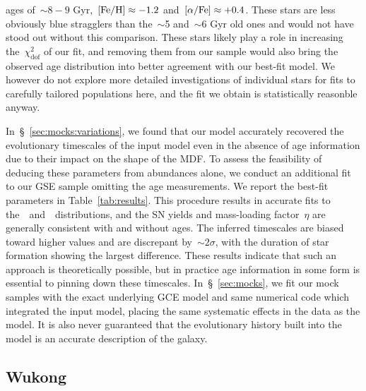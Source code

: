 \documentclass[ms.tex]{subfiles}
\begin{document}
ages of~$\sim$$8 - 9$ Gyr,~$\text{[Fe/H]} \approx -1.2$ and~$\text{[$\alpha$/Fe]} \approx +0.4$.
These stars are less obviously blue stragglers than the~$\sim$5 and~$\sim$6 Gyr
old ones and would not have stood out without this comparison.
These stars likely play a role in increasing the~$\chi_\text{dof}^2$ of our
fit, and removing them from our sample would also bring the observed age
distribution into better agreement with our best-fit model.
We however do not explore more detailed investigations of individual stars for
fits to carefully tailored populations here, and the fit we obtain is
statistically reasonble anyway.
\par
In~\S~\ref{sec:mocks:variations}, we found that our model accurately recovered
the evolutionary timescales of the input model even in the absence of age
information due to their impact on the shape of the MDF.
To assess the feasibility of deducing these parameters from abundances alone,
we conduct an additional fit to our GSE sample omitting the age measurements.
We report the best-fit parameters in Table~\ref{tab:results}.
This procedure results in accurate fits to the~\feh~and~\afe~distributions, and
the SN yields and mass-loading factor~$\eta$ are generally consistent with
and without ages.
The inferred timescales are biased toward higher values and are discrepant
by~$\sim$$2\sigma$, with the duration of star formation showing the largest
difference.
These results indicate that such an approach is theoretically possible, but in
practice age information in some form is essential to pinning down these
timescales.
In~\S~\ref{sec:mocks}, we fit our mock samples with the exact underlying GCE
model and same numerical code which integrated the input model, placing the
same systematic effects in the data as the model.
It is also never guaranteed that the evolutionary history built into the model
is an accurate description of the galaxy.

\subsection{Wukong}
\label{sec:h3:wukong}
\end{document}
